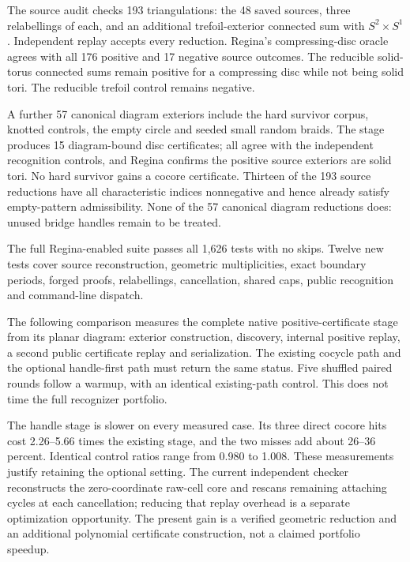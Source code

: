 The source audit checks 193 triangulations: the 48 saved sources, three
relabellings of each, and an additional trefoil-exterior connected sum with
$S^2\times S^1$. Independent replay accepts every reduction. Regina's
compressing-disc oracle agrees with all 176 positive and 17 negative
source outcomes. The reducible solid-torus connected sums remain positive
for a compressing disc while not being solid tori. The reducible trefoil
control remains negative.

A further 57 canonical diagram exteriors include the hard survivor corpus,
knotted controls, the empty circle and seeded small random braids. The stage
produces 15 diagram-bound disc certificates; all agree with the independent
recognition controls, and Regina confirms the positive source exteriors are
solid tori. No hard survivor gains a cocore certificate. Thirteen of the 193
source reductions have all characteristic indices nonnegative and hence
already satisfy empty-pattern admissibility. None of the 57 canonical
diagram reductions does: unused bridge handles remain to be treated.

The full Regina-enabled suite passes all 1,626 tests with no skips. Twelve
new tests cover source reconstruction, geometric multiplicities, exact
boundary periods, forged proofs, relabellings, cancellation, shared caps,
public recognition and command-line dispatch.

The following comparison measures the complete native positive-certificate
stage from its planar diagram: exterior construction, discovery, internal
positive replay, a second public certificate replay and serialization. The
existing cocycle path and the optional handle-first path must return the
same status. Five shuffled paired rounds follow a warmup, with an identical
existing-path control. This does not time the full recognizer portfolio.



The handle stage is slower on every measured case. Its three direct cocore
hits cost 2.26--5.66 times the existing stage, and the two misses add about
26--36 percent. Identical control ratios range from 0.980 to 1.008. These
measurements justify retaining the optional setting. The current independent
checker reconstructs the zero-coordinate raw-cell core and rescans remaining
attaching cycles at each cancellation; reducing that replay overhead is a
separate optimization opportunity. The present gain is a verified geometric
reduction and an additional polynomial certificate construction, not a claimed
portfolio speedup.
